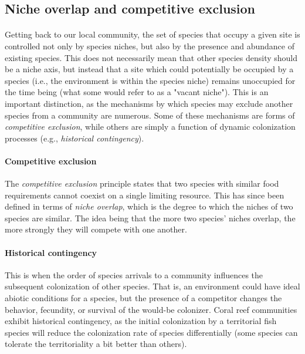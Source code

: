 \documentclass[12pt]{article}
\begin{document}
\subsection*{Niche overlap and competitive exclusion}

\paragraph*{}
Getting back to our local community, the set of species that occupy a given site is controlled not only by species niches, but also by the presence and abundance of existing species. This does not necessarily mean that other species density should be a niche axis, but instead that a site which could potentially be occupied by a species (i.e., the environment is within the species niche) remains unoccupied for the time being (what some would refer to as a "vacant niche"). This is an important distinction, as the mechanisms by which species may exclude another species from a community are numerous. Some of these mechanisms are forms of \textit{competitive exclusion}, while others are simply a function of dynamic colonization processes (e.g., \textit{historical contingency}). 


\paragraph*{Competitive exclusion}

The \textit{competitive exclusion} principle states that two species with similar food requirements cannot coexist on a single limiting resource. This has since been defined in terms of \textit{niche overlap}, which is the degree to which the niches of two species are similar. The idea being that the more two species' niches overlap, the more strongly they will compete with one another. 




\paragraph*{Historical contingency}

This is when the order of species arrivals to a community influences the subsequent colonization of other species. That is, an environment could have ideal abiotic conditions for a species, but the presence of a competitor changes the behavior, fecundity, or survival of the would-be colonizer. Coral reef communities exhibit historical contingency, as the initial colonization by a territorial fish species will reduce the colonization rate of species differentially (some species can tolerate the territoriality a bit better than others).  
\end{document}
